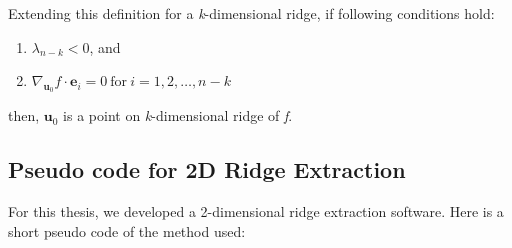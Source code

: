 Extending this definition for a \textit{k}-dimensional ridge, if following conditions hold:
\begin{enumerate}
	\item $\lambda_{n-k} < 0$, and
	\item $ \nabla_{\textbf{u}_{0}} f \cdot \textbf{e}_{i} = 0 \ \text{for} \ i = 1,2,\ldots,n-k $
\end{enumerate}
then, $\textbf{u}_{0}$ is a point on \textit{k}-dimensional ridge of \textit{f}.

\subsection{Pseudo code for 2D Ridge Extraction}
For this thesis, we developed a 2-dimensional ridge extraction software. Here is a short pseudo code of the method used:
\\
